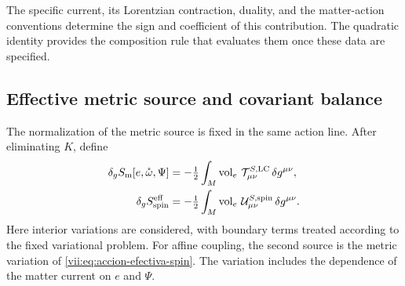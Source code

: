 The specific current, its Lorentzian contraction, duality, and the
matter-action conventions determine the sign and coefficient of this
contribution. The quadratic identity provides the composition rule
that evaluates them once these data are specified.

\subsection{Effective metric source and covariant balance}
\label{vii:subsec:fuente-metrica-efectiva}

The normalization of the metric source is fixed in the same action
line. After eliminating \(K\), define
\begin{align}
 \delta_g S_{\rm m}[e,\mathring\omega,\Psi]
 &=-\tfrac12\int_M\operatorname{vol}_e\,
                   \mathcal T^{S,\rm LC}_{\mu\nu}\,\delta g^{\mu\nu},
 \\
 \delta_g S_{\rm spin}^{\rm eff}
 &=-\tfrac12\int_M\operatorname{vol}_e\,
                   \mathcal U^{S,\rm spin}_{\mu\nu}\,\delta g^{\mu\nu}.
 \label{vii:eq:fuentes-normalizadas-accion}
\end{align}
Here interior variations are considered, with boundary terms treated
according to the fixed variational problem. For affine coupling, the
second source is the metric variation of
\eqref{vii:eq:accion-efectiva-spin}. The variation includes the
dependence of the matter current on \(e\) and \(\Psi\).

